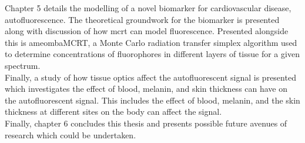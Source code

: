 Chapter 5 details the modelling of a novel biomarker for cardiovascular disease, autofluorescence.
The theoretical groundwork for the biomarker is presented along with discussion of how \gls*{mcrt} can model fluorescence.
Presented alongside this is ameombaMCRT, a Monte Carlo radiation transfer simplex algorithm used to determine concentrations of fluorophores in different layers of tissue for a given spectrum.\\
Finally, a study of how tissue optics affect the autofluorescent signal is presented which investigates the effect of blood, melanin, and skin thickness can have on the autofluorescent signal.
This includes the effect of blood, melanin, and the skin thickness at different sites  on the body can affect the signal.\\


Finally, chapter 6 concludes this thesis and presents possible future avenues of research which could be undertaken.
